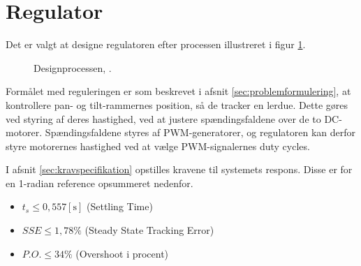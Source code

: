 \section{Regulator}
\label{sec:kontrollerdeign}
Det er valgt at designe regulatoren efter processen illustreret i figur \ref{fig:designproces}.
\begin{figure}[!th]
\centering

\caption[Designprocessen]{Designprocessen, \citep[Side. 260]{reg_modern_control_systems}.}
\label{fig:designproces}
\end{figure}

Formålet med reguleringen er som beskrevet i afsnit \ref{sec:problemformulering},
at kontrollere pan- og tilt-rammernes position, så de tracker en lerdue.
Dette gøres ved styring af deres hastighed, ved at justere spændingsfaldene over de
to DC-motorer. Spændingsfaldene styres af PWM-generatorer, og regulatoren
kan derfor styre motorernes hastighed ved at vælge PWM-signalernes duty cycles.

I afsnit \ref{sec:kravspecifikation} opstilles kravene til systemets respons.
Disse er for en 1-radian reference opsummeret nedenfor.
\begin{itemize}
\item \(t_{s} \leq 0,557 \mathrm{\left[s\right]}\) (Settling Time)
\item \(SSE \leq 1,78 \%\) (Steady State Tracking Error)
\item \(P.O. \leq 34 \%\) (Overshoot i procent)
\end{itemize}


